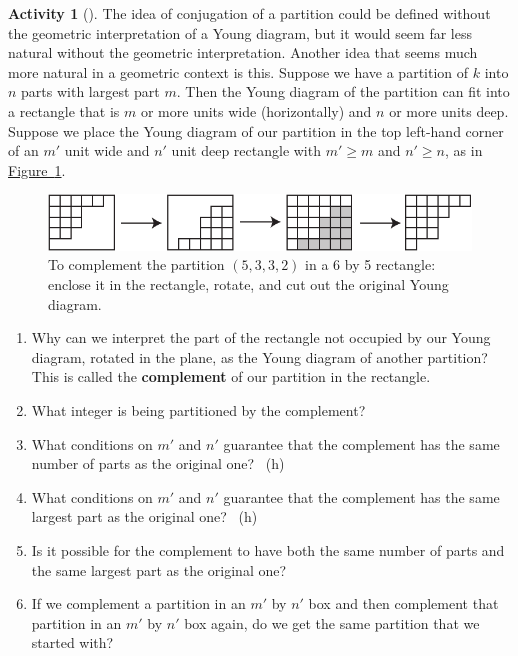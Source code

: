 \documentclass[10pt,]{book}
\newcommand{\terminology}[1]{\textbf{#1}}
\theoremstyle{plain}
\theoremstyle{definition}
\theoremstyle{definition}
\theoremstyle{definition}
\newtheorem{activity}[project]{Activity}
\numberwithin{equation}{chapter}
\begin{document}
\begin{activity}[]\label{activity-301}
\hypertarget{p-1516}{}%
The idea of conjugation of a partition could be defined without the geometric interpretation of a Young diagram, but it would seem far less natural without the geometric interpretation. Another idea that seems much more natural in a geometric context is this. Suppose we have a partition of \(k\) into \(n\) parts with largest part \(m\). Then the Young diagram of the partition can fit into a rectangle that is \(m\) or more units wide (horizontally) and \(n\) or more units deep. Suppose we place the Young diagram of our partition in the top left-hand corner of an \(m'\) unit wide and \(n'\) unit deep rectangle with \(m'\ge m\) and \(n' \ge n\), as in \hyperref[complementpartition]{Figure~\ref{complementpartition}}.%
\begin{figure}
\centering
\includegraphics[width=0.7\linewidth]{images/complementpartition}
\caption{To complement the partition \((5,3,3,2)\) in a 6 by 5 rectangle: enclose it in the rectangle, rotate, and cut out the original Young diagram.\label{complementpartition}}
\end{figure}
\begin{enumerate}[font=\bfseries,label=(\alph*),ref=\alph*]
\item\label{task-263} \hypertarget{p-1517}{}%
Why can we interpret the part of the rectangle not occupied by our Young diagram, rotated in the plane, as the Young diagram of another partition? This is called the \terminology{complement} of our partition in the rectangle.%
\item\label{task-264} \hypertarget{p-1519}{}%
What integer is being partitioned by the complement?%
\item\label{task-265} \hypertarget{p-1521}{}%
What conditions on \(m'\) and \(n'\) guarantee that the complement has the same number of parts as the original one?%
~{\tiny (h)}\item\label{task-266} \hypertarget{p-1524}{}%
What conditions on \(m'\) and \(n'\) guarantee that the complement has the same largest part as the original one?%
~{\tiny (h)}\item\label{task-267} \hypertarget{p-1527}{}%
Is it possible for the complement to have both the same number of parts and the same largest part as the original one?%
\item\label{task-268} \hypertarget{p-1529}{}%
If we complement a partition in an \(m'\) by \(n'\) box and then complement that partition in an \(m'\) by \(n'\) box again, do we get the same partition that we started with?%
\end{enumerate}
\end{activity}
\end{document}
